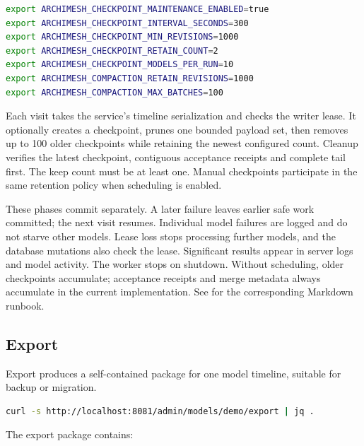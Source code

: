 \begin{lstlisting}[language=bash,caption={Example opt-in policy, exported before server startup}]
export ARCHIMESH_CHECKPOINT_MAINTENANCE_ENABLED=true
export ARCHIMESH_CHECKPOINT_INTERVAL_SECONDS=300
export ARCHIMESH_CHECKPOINT_MIN_REVISIONS=1000
export ARCHIMESH_CHECKPOINT_RETAIN_COUNT=2
export ARCHIMESH_CHECKPOINT_MODELS_PER_RUN=10
export ARCHIMESH_COMPACTION_RETAIN_REVISIONS=1000
export ARCHIMESH_COMPACTION_MAX_BATCHES=100
\end{lstlisting}


Each visit takes the service's timeline serialization and checks the writer
lease. It optionally creates a checkpoint, prunes one bounded payload set,
then removes up to 100 older checkpoints while retaining the newest configured
count. Cleanup verifies the latest checkpoint, contiguous acceptance receipts
and complete tail first. The keep count must be at least one. Manual
checkpoints participate in the same retention policy when scheduling is enabled.

These phases commit separately. A later failure leaves earlier safe work
committed; the next visit resumes. Individual model failures are logged and do
not starve other models. Lease loss stops processing further models, and the
database mutations also check the lease. Significant results appear in server
logs and model activity. The worker stops on shutdown. Without scheduling,
older checkpoints accumulate; acceptance receipts and merge metadata always
accumulate in the current implementation. See
 for the corresponding Markdown runbook.

\subsection{Export}

Export produces a self-contained package for one model timeline, suitable for
backup or migration.

\begin{lstlisting}[language=bash,caption={Export a model}]
curl -s http://localhost:8081/admin/models/demo/export | jq .
\end{lstlisting}

The export package contains:

